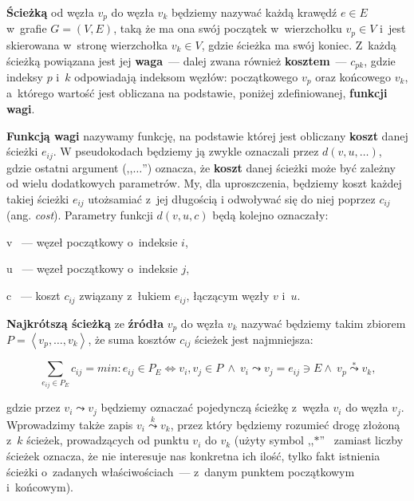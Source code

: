 \begin{myitemize}

\item \textbf{Ścieżką} od węzła $v_{p}$ do węzła $v_{k}$ będziemy nazywać każdą krawędź $e \in E$ w~grafie $G = \left( V, E \right)$, taką że ma ona swój początek w~wierzchołku $v_{p} \in V$ i~jest skierowana w~stronę wierzchołka $v_{k} \in V$, gdzie ścieżka ma swój koniec. Z~każdą ścieżką powiązana jest jej \textbf{waga}~---  dalej zwana również \textbf{kosztem}~---  $c_{pk}$, gdzie indeksy $p$ i~$k$ odpowiadają indeksom węzłów: początkowego $v_{p}$ oraz końcowego $v_{k}$, a~którego wartość jest obliczana na podstawie, poniżej zdefiniowanej, \textbf{funkcji wagi}.

\item \textbf{Funkcją wagi} nazywamy funkcję, na podstawie której jest obliczany \textbf{koszt} danej ścieżki $e_{ij}$. W pseudokodach będziemy ją zwykle oznaczali przez $ d \left( v, u, \ldots \right) $, gdzie ostatni argument (,,$\ldots$'') oznacza, że \textbf{koszt} danej ścieżki może być zależny od wielu dodatkowych parametrów. My, dla uproszczenia, będziemy koszt każdej takiej ścieżki $e_{ij}$ utożsamiać z~jej długością i odwoływać się do niej poprzez $c_{ij}$ (ang. \textit{cost}). Parametry funkcji $ d \left( v, u, c \right) $ będą kolejno oznaczały:

\begin{myitemize}

\item[v]~---  węzeł początkowy o~indeksie $i$,
\item[u]~---  węzeł początkowy o~indeksie $j$,
\item[c]~---  koszt $c_{ij}$ związany z~łukiem $e_{ij}$, łączącym węzły $v$ i~$u$.

\end{myitemize}


\item \textbf{Najkrótszą ścieżką} ze \textbf{źródła} $v_{p}$ do węzła $v_{k}$ nazywać będziemy takim zbiorem $P = \left \langle v_{p}, \ldots, v_{k} \right \rangle $, że suma kosztów $c_{ij}$ ścieżek jest najmniejsza:

\begin{equation}
\sum_{e_{ij} \in P_{E}} c_{ij} = min : e_{ij} \in P_{E} \Leftrightarrow v_{i},v_{j} \in P \: \wedge \: v_{i} \leadsto v_{j} = e_{ij} \ni E \wedge \: v_{p} \overset{*}\leadsto v_{k}\textrm{,}
\end{equation}

gdzie przez $v_{i} \leadsto v_{j}$ będziemy oznaczać pojedynczą ścieżkę z~węzła $v_{i}$ do węzła $v_{j}$. Wprowadzimy także zapis $v_{i} \overset{k}\leadsto v_{k}$, przez który będziemy rozumieć drogę złożoną z~$k$ ścieżek, prowadzących od punktu $v_{i}$ do $v_{k}$ (użyty symbol ,,$*$''~ zamiast liczby ścieżek oznacza, że nie interesuje nas konkretna ich ilość, tylko fakt istnienia ścieżki o~zadanych właściwościach~---  z~danym punktem początkowym i~końcowym). 


\end{myitemize}

